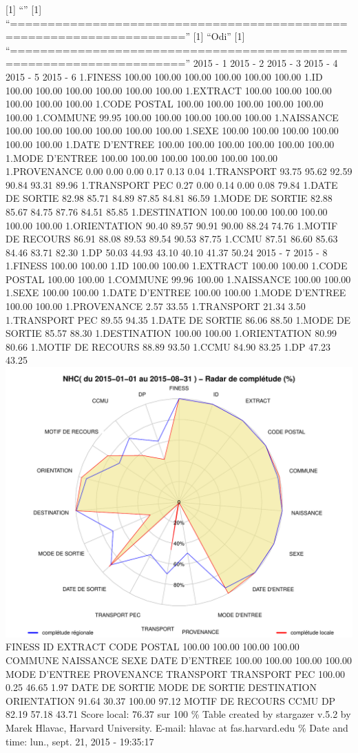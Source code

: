 \documentclass[]{article}
\begin{document}
{[}1{]} ``'' {[}1{]}
``=====================================================================''
{[}1{]} ``Odi'' {[}1{]}
``=====================================================================''
2015 - 1 2015 - 2 2015 - 3 2015 - 4 2015 - 5 2015 - 6 1.FINESS 100.00
100.00 100.00 100.00 100.00 100.00 1.ID 100.00 100.00 100.00 100.00
100.00 100.00 1.EXTRACT 100.00 100.00 100.00 100.00 100.00 100.00 1.CODE
POSTAL 100.00 100.00 100.00 100.00 100.00 100.00 1.COMMUNE 99.95 100.00
100.00 100.00 100.00 100.00 1.NAISSANCE 100.00 100.00 100.00 100.00
100.00 100.00 1.SEXE 100.00 100.00 100.00 100.00 100.00 100.00 1.DATE
D'ENTREE 100.00 100.00 100.00 100.00 100.00 100.00 1.MODE D'ENTREE
100.00 100.00 100.00 100.00 100.00 100.00 1.PROVENANCE 0.00 0.00 0.00
0.17 0.13 0.04 1.TRANSPORT 93.75 95.62 92.59 90.84 93.31 89.96
1.TRANSPORT PEC 0.27 0.00 0.14 0.00 0.08 79.84 1.DATE DE SORTIE 82.98
85.71 84.89 87.85 84.81 86.59 1.MODE DE SORTIE 82.88 85.67 84.75 87.76
84.51 85.85 1.DESTINATION 100.00 100.00 100.00 100.00 100.00 100.00
1.ORIENTATION 90.40 89.57 90.91 90.00 88.24 74.76 1.MOTIF DE RECOURS
86.91 88.08 89.53 89.54 90.53 87.75 1.CCMU 87.51 86.60 85.63 84.46 83.71
82.30 1.DP 50.03 44.93 43.10 40.10 41.37 50.24 2015 - 7 2015 - 8
1.FINESS 100.00 100.00 1.ID 100.00 100.00 1.EXTRACT 100.00 100.00 1.CODE
POSTAL 100.00 100.00 1.COMMUNE 99.96 100.00 1.NAISSANCE 100.00 100.00
1.SEXE 100.00 100.00 1.DATE D'ENTREE 100.00 100.00 1.MODE D'ENTREE
100.00 100.00 1.PROVENANCE 2.57 33.55 1.TRANSPORT 21.34 3.50 1.TRANSPORT
PEC 89.55 94.35 1.DATE DE SORTIE 86.06 88.50 1.MODE DE SORTIE 85.57
88.30 1.DESTINATION 100.00 100.00 1.ORIENTATION 80.99 80.66 1.MOTIF DE
RECOURS 88.89 93.50 1.CCMU 84.90 83.25 1.DP 47.23 43.25
\includegraphics{completude_files/figure-latex/finess-15.pdf} FINESS ID
EXTRACT CODE POSTAL 100.00 100.00 100.00 100.00 COMMUNE NAISSANCE SEXE
DATE D'ENTREE 100.00 100.00 100.00 100.00 MODE D'ENTREE PROVENANCE
TRANSPORT TRANSPORT PEC 100.00 0.25 46.65 1.97 DATE DE SORTIE MODE DE
SORTIE DESTINATION ORIENTATION 91.64 30.37 100.00 97.12 MOTIF DE RECOURS
CCMU DP 82.19 57.18 43.71 Score local: 76.37 sur 100 \% Table created by
stargazer v.5.2 by Marek Hlavac, Harvard University. E-mail: hlavac at
fas.harvard.edu \% Date and time: lun., sept. 21, 2015 - 19:35:17
\end{document}
